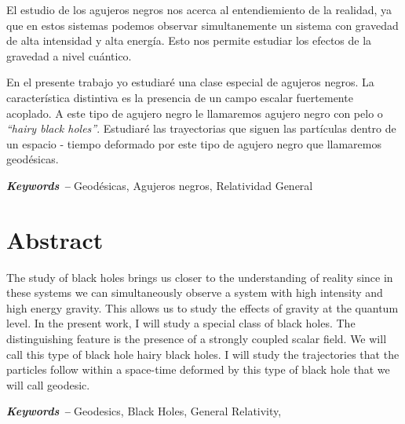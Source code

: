 \documentclass[../Main.tex]{subfiles}
\begin{document}
El estudio de los agujeros negros nos acerca al entendiemiento de la realidad, ya que en estos sistemas podemos observar simultanemente un sistema con gravedad de alta intensidad y alta energía. Esto nos permite estudiar los efectos de la gravedad a nivel cuántico. 

En el presente trabajo yo estudiaré una clase especial de agujeros negros. La característica distintiva es la presencia de un campo escalar fuertemente acoplado. A este tipo de agujero negro le llamaremos agujero negro con pelo o \textit{``hairy black holes''}. Estudiaré las trayectorias que siguen las partículas dentro de un espacio - tiempo deformado por este tipo de agujero negro que llamaremos geodésicas.


\par\vspace*{\fill} %
\textbf{\textit{Keywords --}} Geodésicas, Agujeros negros, Relatividad General %

\newpage
{} %
\section*{Abstract}
The study of black holes brings us closer to the understanding of reality since in these systems we can simultaneously observe a system with high intensity and high energy gravity. This allows us to study the effects of gravity at the quantum level. In the present work, I will study a special class of black holes. The distinguishing feature is the presence of a strongly coupled scalar field. We will call this type of black hole hairy black holes. I will study the trajectories that the particles follow within a space-time deformed by this type of black hole that we will call geodesic.


\par\vspace*{\fill} %
\textbf{\textit{Keywords --}} Geodesics, Black Holes, General Relativity,  %

\biblio %
\end{document}
